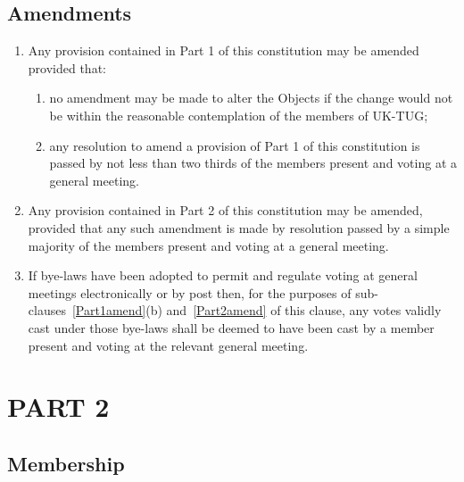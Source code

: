 \documentclass[a4paper,11pt]{article}
\begin{document}
\subsection{Amendments}

\begin{enumerate}
\item \label{Part1amend}Any provision contained in Part 1 of this constitution may be amended
  provided that:
\begin{enumerate}
\item no amendment may be made to alter the Objects if the change would not be
  within the reasonable contemplation of the members of UK-TUG;
\item any resolution to amend a provision of Part 1 of this constitution is
  passed by not less than two thirds of the members present and voting at a
  general meeting.
\end{enumerate}
\item \label{Part2amend} Any provision contained in Part 2 of this constitution may be amended,
  provided that any such amendment is made by resolution passed by a simple
  majority of the members present and voting at a general meeting.
\item If bye-laws have been adopted to permit and regulate voting at general meetings electronically or by post then, for the purposes of sub-clauses~\ref{Part1amend}(b) and~\ref{Part2amend} of this clause, any votes validly cast under those bye-laws shall be deemed to have been cast by a member present and voting at the relevant general meeting.
\end{enumerate}

\section*{PART 2}

\subsection{Membership}
\end{document}
